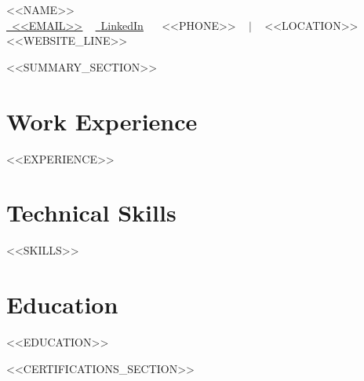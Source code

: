\documentclass[letterpaper,11pt]{article}
\newcommand{\resumeSubHeadingListStart}{\begin{itemize}[leftmargin=0.0in, label={}]}
\newcommand{\resumeSubHeadingListEnd}{\end{itemize}}
\begin{document}
    \begin{center}
        {\Huge\scshape <<NAME>>} \\
        \small
        \href{mailto:<<EMAIL>>}{\raisebox{-0.2\height}\faEnvelope\  \underline{<<EMAIL>>}} ~
        \href{<<LINKEDIN>>}{\raisebox{-0.2\height}\faLinkedin\ \underline{LinkedIn}}  ~
        \faPhone\ <<PHONE>> ~ $|$ ~ <<LOCATION>>
        <<WEBSITE_LINE>>
    \end{center}

<<SUMMARY_SECTION>>

\section{Work Experience}
  \resumeSubHeadingListStart
<<EXPERIENCE>>
  \resumeSubHeadingListEnd

\section{Technical Skills}
\vspace{-7pt}
\begin{itemize}[leftmargin=0.15in, label={}]\small{\item{
<<SKILLS>>
}}
\end{itemize}

\section{Education}
  \resumeSubHeadingListStart
<<EDUCATION>>
  \resumeSubHeadingListEnd

<<CERTIFICATIONS_SECTION>>
\end{document}
